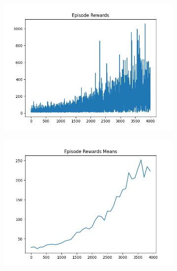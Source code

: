 \begin{figure}[H]
    \centering
    \begin{subfigure}{.47\linewidth}
        \centering
        \includegraphics[width=\textwidth]{pole/2024-06-14_09-34-50_dqn_cartpole_episode_rewards.png}
    \end{subfigure}
    \begin{subfigure}{.47\linewidth}
        \centering
        \includegraphics[width=\textwidth]{pole/2024-06-14_09-34-50_dqn_cartpole_episode_rewards_means.png}
    \end{subfigure}
    \begin{subfigure}{.47\linewidth}
        \centering

\end{subfigure}
\end{figure}
